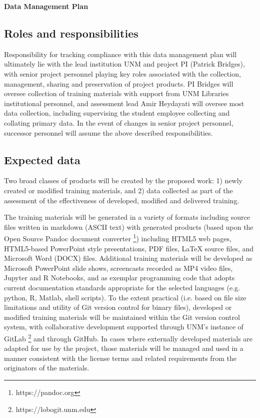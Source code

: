\documentclass[11pt]{article}
\begin{document}
\begin{center}
{\Large\sc\bf Data Management Plan}
\end{center}

\label{sec:dmp}

\subsection*{Roles and
responsibilities}\label{roles-and-responsibilities}

Responsibility for tracking compliance with this data management plan will ultimately lie with the lead institution UNM and project PI (Patrick Bridges), with senior project personnel playing key roles associated with the collection, management, sharing and preservation of project products. PI Bridges will oversee collection of training materials with support from UNM Libraries institutional personnel, and assessment lead Amir Heydayati will oversee most data collection, including supervising the student employee collecting and collating primary data. In the event of changes in senior project personnel, successor personnel will assume the above described responsibilities.  

\subsection*{Expected data}\label{expected-data}

Two broad classes of products will be created by the proposed work: 1) newly created or modified training materials, and 2) data collected as part of the assessment of the effectiveness of developed, modified and delivered training. 

The training materials will be generated in a variety of formats including source files written in markdown (ASCII text) with generated products (based upon the Open Source Pandoc document converter \footnote{https://pandoc.org}) including HTML5 web pages, HTML5-based PowerPoint style presentations, PDF files, LaTeX source files, and Microsoft Word (DOCX) files. Additional training materials will be developed as Microsoft PowerPoint slide shows, screencasts recorded as MP4 video files, Jupyter and R Notebooks, and as exemplar programming code that adopts current documentation standards appropriate for the selected languages (e.g. python, R, Matlab, shell scripts). To the extent practical (i.e. based on file size limitations and utility of Git version control for binary files), developed or modified training materials will be maintained within the Git version control system, with collaborative development supported through UNM's instance of GitLab \footnote{https://lobogit.unm.edu} and through GitHub. In cases where externally developed materials are adapted for use by the project, those materials will be managed and used in a manner consistent with the license terms and related requirements from the originators of the materials. 
\end{document}

